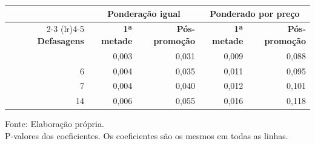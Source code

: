 \begingroup
\setlength{}
\setlength{}
\fontsize{12.0pt}{14.4pt}\selectfont

\setlength{\LTpost}{0mm}
\begin{longtable}{@{\extracolsep{\fill}}rrrrr}

\toprule
 & \multicolumn{2}{c}{\textbf{Ponderação igual}} & \multicolumn{2}{c}{\textbf{Ponderado por preço}} \\ 
\cmidrule(lr){2-3} \cmidrule(lr){4-5}
\textbf{Defasagens} & \textbf{1ª metade} & \textbf{Pós-promoção} & \textbf{1ª metade} & \textbf{Pós-promoção} \\ 
\midrule\addlinespace[2.5pt]
5 & 0,003 & 0,031 & 0,009 & 0,088 \\
6 & 0,004 & 0,035 & 0,011 & 0,095 \\
7 & 0,004 & 0,040 & 0,012 & 0,101 \\
14 & 0,006 & 0,055 & 0,016 & 0,118 \\
\bottomrule
\end{longtable}
\begin{minipage}{\linewidth}
Fonte: Elaboração própria.\\
P-valores dos coeficientes. Os coeficientes são os mesmos em todas as linhas.\\
\end{minipage}
\endgroup
